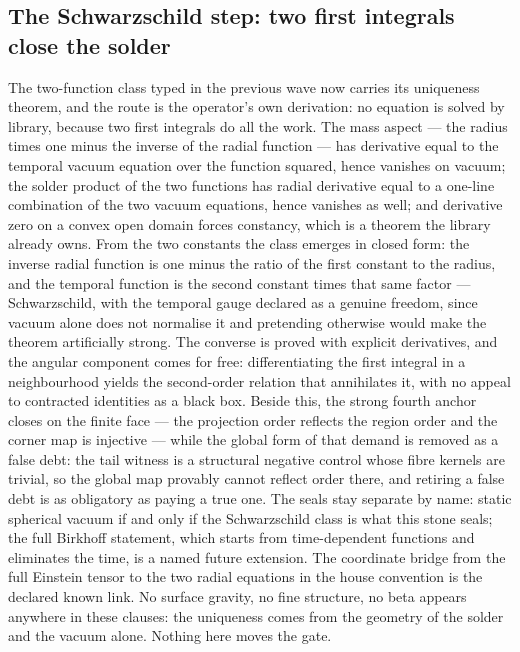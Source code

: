 \documentclass[11pt]{article}
\theoremstyle{definition}\newtheorem{deriv}{Derivation}
\begin{document}
\subsection*{The Schwarzschild step: two first integrals close the solder}The two-function class typed in the previous wave now carries its uniqueness theorem, and the route is the operator's own derivation: no equation is solved by library, because two first integrals do all the work. The mass aspect --- the radius times one minus the inverse of the radial function --- has derivative equal to the temporal vacuum equation over the function squared, hence vanishes on vacuum; the solder product of the two functions has radial derivative equal to a one-line combination of the two vacuum equations, hence vanishes as well; and derivative zero on a convex open domain forces constancy, which is a theorem the library already owns. From the two constants the class emerges in closed form: the inverse radial function is one minus the ratio of the first constant to the radius, and the temporal function is the second constant times that same factor --- Schwarzschild, with the temporal gauge declared as a genuine freedom, since vacuum alone does not normalise it and pretending otherwise would make the theorem artificially strong. The converse is proved with explicit derivatives, and the angular component comes for free: differentiating the first integral in a neighbourhood yields the second-order relation that annihilates it, with no appeal to contracted identities as a black box. Beside this, the strong fourth anchor closes on the finite face --- the projection order reflects the region order and the corner map is injective --- while the global form of that demand is removed as a false debt: the tail witness is a structural negative control whose fibre kernels are trivial, so the global map provably cannot reflect order there, and retiring a false debt is as obligatory as paying a true one. The seals stay separate by name: static spherical vacuum if and only if the Schwarzschild class is what this stone seals; the full Birkhoff statement, which starts from time-dependent functions and eliminates the time, is a named future extension. The coordinate bridge from the full Einstein tensor to the two radial equations in the house convention is the declared known link. No surface gravity, no fine structure, no beta appears anywhere in these clauses: the uniqueness comes from the geometry of the solder and the vacuum alone. Nothing here moves the gate.
\end{document}
